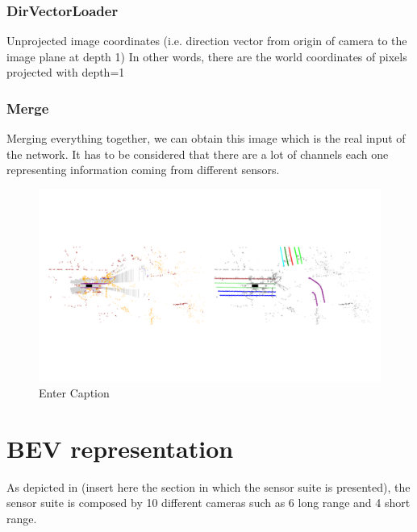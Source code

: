 \subsubsection{DirVectorLoader}
Unprojected image coordinates
(i.e. direction vector from origin of camera to the image plane at depth 1)
In other words, there are the world coordinates of pixels projected with depth=1

\subsubsection{Merge}
Merging everything together, we can obtain this image which is the real input of the network. It has to be considered that there are a lot of channels each one representing information coming from different sensors. 
\begin{figure}
    \centering
    \includegraphics[width=1\linewidth]{LateX//figs/inputt.pdf}
    \caption{Enter Caption}
    \label{fig:enter-label}
\end{figure}


\section{BEV representation}
As depicted in (insert here the section in which the sensor suite is presented), the sensor suite is composed by 10 different cameras such as 6 long range and 4 short range. 

